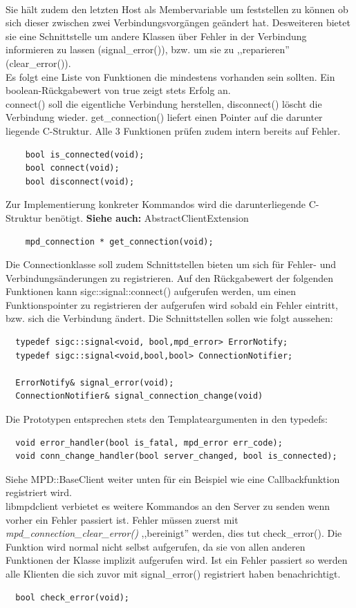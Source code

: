 \\
Sie hält zudem den letzten Host als Membervariable um feststellen zu können ob sich dieser zwischen 
zwei Verbindungsvorgängen geändert hat. Desweiteren bietet sie eine Schnittstelle um andere Klassen über Fehler in der Verbindung informieren zu lassen (signal\_error()), bzw. um sie zu ,,reparieren'' (clear\_error()).
\\
Es folgt eine Liste von Funktionen die mindestens vorhanden sein sollten.
Ein boolean-Rückgabewert von true zeigt stets Erfolg an.
\\
connect() soll die eigentliche Verbindung herstellen, disconnect() löscht die Verbindung wieder.
get\_connection() liefert einen Pointer auf die darunter liegende C-Struktur.
Alle 3 Funktionen prüfen zudem intern bereits auf Fehler. 
\begin{verbatim}
    bool is_connected(void);
    bool connect(void);
    bool disconnect(void);
\end{verbatim}

Zur Implementierung konkreter Kommandos wird die darunterliegende C-Struktur benötigt.
\textbf{Siehe auch:} AbstractClientExtension
\begin{verbatim}
    mpd_connection * get_connection(void);
\end{verbatim}

Die Connectionklasse soll zudem Schnittstellen bieten um sich für Fehler- und Verbindungsänderungen
zu registrieren. 
Auf den Rückgabewert der folgenden Funktionen kann sigc::signal::connect() aufgerufen werden,
um einen Funktionspointer zu registrieren der aufgerufen wird sobald ein Fehler eintritt,
bzw. sich die Verbindung ändert. Die Schnittstellen sollen wie folgt aussehen:
\begin{verbatim}
  typedef sigc::signal<void, bool,mpd_error> ErrorNotify;
  typedef sigc::signal<void,bool,bool> ConnectionNotifier;
    
  ErrorNotify& signal_error(void);
  ConnectionNotifier& signal_connection_change(void)
\end{verbatim}

Die Prototypen entsprechen stets den Templateargumenten in den typedefs:
\begin{verbatim}
  void error_handler(bool is_fatal, mpd_error err_code);
  void conn_change_handler(bool server_changed, bool is_connected); 
\end{verbatim} 

Siehe MPD::BaseClient weiter unten für ein Beispiel wie eine Callbackfunktion registriert wird.
\\
libmpdclient verbietet es weitere Kommandos an den Server zu senden wenn vorher ein Fehler passiert ist.
Fehler müssen zuerst mit \emph{mpd\_connection\_clear\_error()} ,,bereinigt'' werden, 
dies tut check\_error(). Die Funktion wird normal nicht selbst aufgerufen, da sie von allen anderen Funktionen der Klasse
implizit aufgerufen wird. Ist ein Fehler passiert so werden alle Klienten die sich zuvor
mit signal\_error() registriert haben benachrichtigt. 
\begin{verbatim}
  bool check_error(void);
\end{verbatim}

